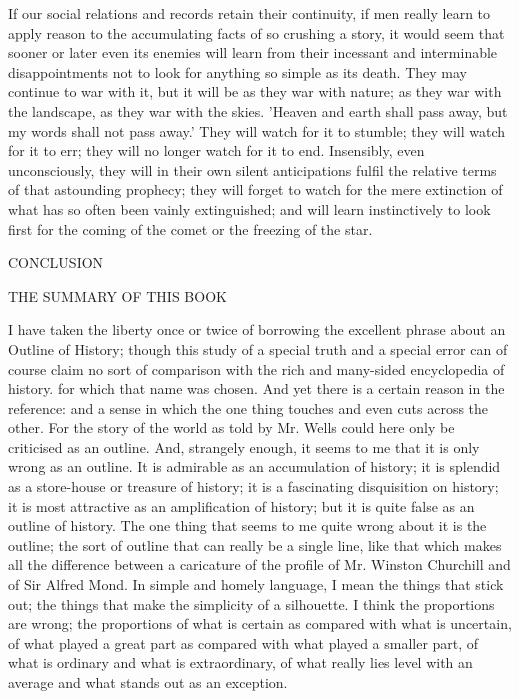If our social relations and records retain their continuity, if men really learn to apply reason to the accumulating facts of so crushing a story, it would seem that sooner or later even its enemies will learn from their incessant and interminable disappointments not to look for anything so simple as its death. They may continue to war with it, but it will be as they war with nature; as they war with the landscape, as they war with the skies. 'Heaven and earth shall pass away, but my words shall not pass away.' They will watch for it to stumble; they will watch for it to err; they will no longer watch for it to end. Insensibly, even unconsciously, they will in their own silent anticipations fulfil the relative terms of that astounding prophecy; they will forget to watch for the mere extinction of what has so often been vainly extinguished; and will learn instinctively to look first for the coming of the comet or the freezing of the star.

CONCLUSION

THE SUMMARY OF THIS BOOK

I have taken the liberty once or twice of borrowing the excellent phrase about an Outline of History; though this study of a special truth and a special error can of course claim no sort of comparison with the rich and many-sided encyclopedia of history. for which that name was chosen. And yet there is a certain reason in the reference: and a sense in which the one thing touches and even cuts across the other. For the story of the world as told by Mr. Wells could here only be criticised as an outline. And, strangely enough, it seems to me that it is only wrong as an outline. It is admirable as an accumulation of history; it is splendid as a store-house or treasure of history; it is a fascinating disquisition on history; it is most attractive as an amplification of history; but it is quite false as an outline of history. The one thing that seems to me quite wrong about it is the outline; the sort of outline that can really be a single line, like that which makes all the difference between a caricature of the profile of Mr. Winston Churchill and of Sir Alfred Mond. In simple and homely language, I mean the things that stick out; the things that make the simplicity of a silhouette. I think the proportions are wrong; the proportions of what is certain as compared with what is uncertain, of what played a great part as compared with what played a smaller part, of what is ordinary and what is extraordinary, of what really lies level with an average and what stands out as an exception.

